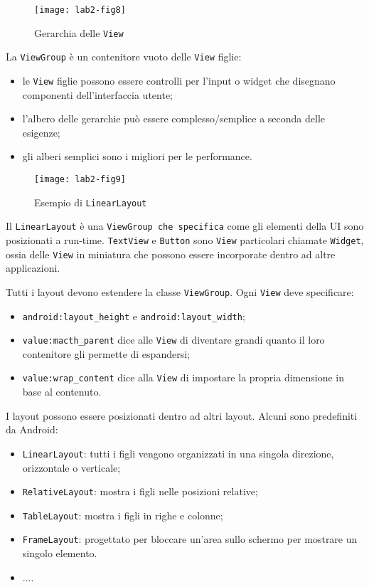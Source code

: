 \begin{figure}[htbp]
	\centering
	\texttt{[image: lab2-fig8]}
	\caption[Gerarchia View]{Gerarchia delle \texttt{View}}\label{img:lab2-fig8}
\end{figure}

La \texttt{ViewGroup} è un contenitore vuoto delle \texttt{View} figlie:
\begin{itemize}
\item le \texttt{View} figlie possono essere controlli per l'input o widget che disegnano componenti dell'interfaccia utente;
\item l'albero delle gerarchie può essere complesso/semplice a seconda delle esigenze;
\item gli alberi semplici sono i migliori per le performance.
\end{itemize}

\begin{figure*}[htbp]
	\centering
	\texttt{[image: lab2-fig9]}
	\caption[LinearLayout]{Esempio di \texttt{LinearLayout}}
	\label{img:lab2-fig9}
\end{figure*}

Il \texttt{LinearLayout} è una \texttt{ViewGroup che specifica} come gli elementi della UI sono posizionati a run-time. \texttt{TextView} e \texttt{Button} sono \texttt{View} particolari chiamate \texttt{Widget}, ossia delle \texttt{View} in miniatura che possono essere incorporate dentro ad altre applicazioni.

Tutti i layout devono estendere la classe \texttt{ViewGroup}. Ogni \texttt{View} deve specificare:
\begin{itemize}
\item \texttt{android:layout\_height} e \texttt{android:layout\_width};
\item \texttt{value:macth\_parent} dice alle \texttt{View} di diventare grandi quanto il loro contenitore gli permette di espandersi;
\item \texttt{value:wrap_content} dice alla \texttt{View} di impostare la propria dimensione in base al contenuto.
\end{itemize}

I layout possono essere posizionati dentro ad altri layout. Alcuni sono predefiniti da Android:

\begin{itemize}
\item \texttt{LinearLayout}: tutti i figli vengono organizzati in una singola direzione, orizzontale o verticale;
\item \texttt{RelativeLayout}: mostra i figli nelle posizioni relative;
\item \texttt{TableLayout}: mostra i figli in righe e colonne;
\item \texttt{FrameLayout}: progettato per bloccare un'area sullo schermo per mostrare un singolo elemento.
\item ....
\end{itemize}

